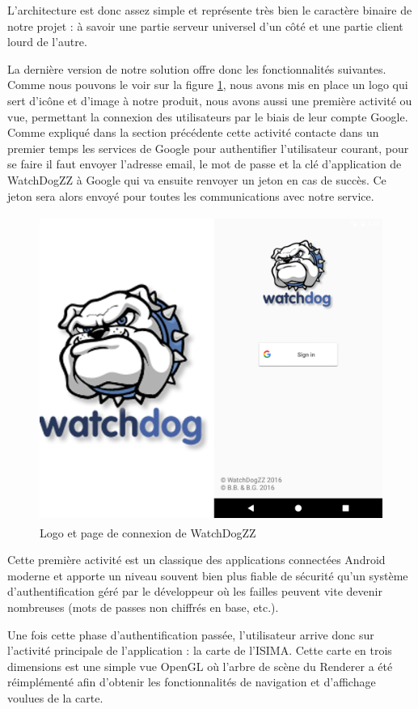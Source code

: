 L’architecture est donc assez simple et représente très bien le caractère binaire de notre projet : à savoir une partie serveur universel d’un côté et une partie client lourd de l’autre.

La dernière version de notre solution offre donc les fonctionnalités suivantes. Comme nous pouvons le voir sur la figure \ref{screen1}, nous avons mis en place un logo qui sert d’icône et d’image à notre produit, nous avons aussi une première activité ou vue, permettant la connexion des utilisateurs par le biais de leur compte Google. Comme expliqué dans la section précédente cette activité contacte dans un premier temps les services de Google pour authentifier l’utilisateur courant, pour se faire il faut envoyer l’adresse email, le mot de passe et la clé d’application de WatchDogZZ à Google qui va ensuite renvoyer un jeton en cas de succès. Ce jeton sera alors envoyé pour toutes les communications avec notre service.

\begin{figure}[H]
    \centering
    \includegraphics[height=10cm]{./img/screen1.png}
    \caption{Logo et page de connexion de WatchDogZZ}
    \label{screen1}
\end{figure}

Cette première activité est un classique des applications connectées Android moderne et apporte un niveau souvent bien plus fiable de sécurité qu'un système d'authentification géré par le développeur où les failles peuvent vite devenir nombreuses (mots de passes non chiffrés en base, etc.).

Une fois cette phase d’authentification passée, l’utilisateur arrive donc sur l’activité principale de l’application : la carte de l’ISIMA. Cette carte en trois dimensions est une simple vue OpenGL où l’arbre de scène du Renderer a été réimplémenté afin d’obtenir les fonctionnalités de navigation et d’affichage voulues de la carte.

